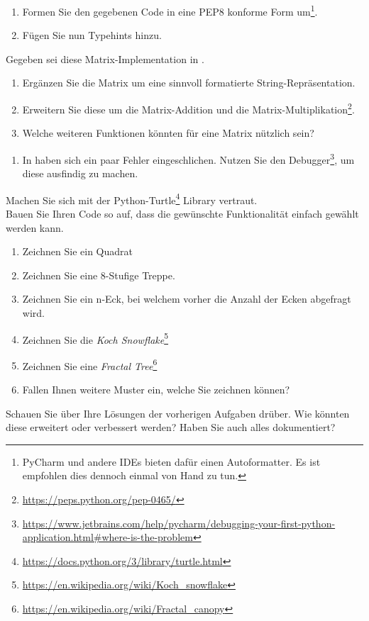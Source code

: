 \documentclass{ubo_tex_uebungszettel/uebungszettel}
\theoremstyle{definition}
\newcommand{\pp}[1]{\lpl{#1}}
\newcommand{\furl}[1]{\footnote{\url{#1}}}
\begin{document}
\medskip
\noindent {} \quad

    \noindent 
    \begin{enumerate}
        \item Formen Sie den gegebenen Code \pp{pep8.py} in eine PEP8 konforme Form um\footnote{PyCharm und andere IDEs bieten dafür einen Autoformatter. Es ist empfohlen dies dennoch einmal von Hand zu tun.}.
        \item Fügen Sie nun Typehints hinzu.
    \end{enumerate}

\medskip
\noindent {} \quad

\noindent
     Gegeben sei diese Matrix-Implementation in \pp{matrix.py}.
    \begin{enumerate}
        \item Ergänzen Sie die Matrix um eine sinnvoll formatierte String-Repräsentation.
        \item Erweitern Sie diese um die Matrix-Addition und die Matrix-Multiplikation\furl{https://peps.python.org/pep-0465/}.
        \item Welche weiteren Funktionen könnten für eine Matrix nützlich sein?
        \noindent 
    \end{enumerate}

\pagebreak
\medskip
\noindent {} \quad

\noindent
    \begin{enumerate}
        \item In \pp{debugging.py} haben sich ein paar Fehler eingeschlichen. Nutzen Sie den Debugger\furl{https://www.jetbrains.com/help/pycharm/debugging-your-first-python-application.html\#where-is-the-problem}, um diese ausfindig zu machen.
        \noindent 
    \end{enumerate}


\medskip
\noindent {} \quad


    \noindent Machen Sie sich mit der Python-Turtle\furl{https://docs.python.org/3/library/turtle.html} Library vertraut.\\
    Bauen Sie Ihren Code so auf, dass die gewünschte Funktionalität einfach gewählt werden kann.
    \begin{enumerate}
        \item Zeichnen Sie ein Quadrat
        \item Zeichnen Sie eine 8-Stufige Treppe.
        \item Zeichnen Sie ein n-Eck, bei welchem vorher die Anzahl der Ecken abgefragt wird.
        \item Zeichnen Sie die \textsl{Koch Snowflake}\furl{https://en.wikipedia.org/wiki/Koch_snowflake}
        \item Zeichnen Sie eine \textsl{Fractal Tree}\furl{https://en.wikipedia.org/wiki/Fractal_canopy}
        \item Fallen Ihnen weitere Muster ein, welche Sie zeichnen können?
        \noindent 
    \end{enumerate}

    \medskip
\noindent {} \quad
\noindent
    Schauen Sie über Ihre Lösungen der vorherigen Aufgaben drüber. Wie könnten diese erweitert oder verbessert werden? Haben Sie auch alles dokumentiert?
\end{document}
